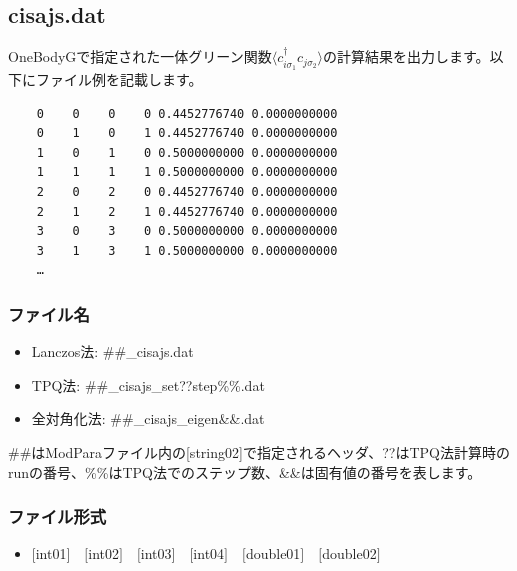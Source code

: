 \newpage
\subsection{cisajs.dat}
\label{Subsec:cgcisajs}
OneBodyGで指定された一体グリーン関数$\langle c_{i\sigma_1}^{\dagger}c_{j\sigma_2}\rangle$の計算結果を出力します。以下にファイル例を記載します。

\begin{minipage}{12.5cm}
\begin{screen}
\begin{verbatim}
    0    0    0    0 0.4452776740 0.0000000000
    0    1    0    1 0.4452776740 0.0000000000
    1    0    1    0 0.5000000000 0.0000000000
    1    1    1    1 0.5000000000 0.0000000000
    2    0    2    0 0.4452776740 0.0000000000
    2    1    2    1 0.4452776740 0.0000000000
    3    0    3    0 0.5000000000 0.0000000000
    3    1    3    1 0.5000000000 0.0000000000
    …
\end{verbatim}
\end{screen}
\end{minipage}

\subsubsection{ファイル名}
 \begin{itemize}
   \item{Lanczos法:}  \#\#\_cisajs.dat
   \item{TPQ法:} \#\#\_cisajs\_set??step\%\%.dat
   \item{全対角化法:}  \#\#\_cisajs\_eigen{\&\&}.dat
  \end{itemize}
  \#\#はModParaファイル内の[string02]で指定されるヘッダ、??はTPQ法計算時のrunの番号、\%\%はTPQ法でのステップ数、\&\&は固有値の番号を表します。


\subsubsection{ファイル形式}
 \begin{itemize}
   \item  $[$int01$]$~~$[$int02$]$~~$[$int03$]$~~$[$int04$]$~~$[$double01$]$~~$[$double02$]$
  \end{itemize}
